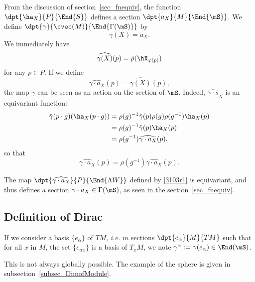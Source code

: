 From the discussion of section~\ref{sec_fnequiv}, the function $\dpt{\ha_X}{P}{\End{S}}$ defines a section $\dpt{a_X}{M}{\End{\mS}}$. We define $\dpt{\gamma}{\cvec(M)}{\End{\Gamma(\mS)}}$ by
\begin{equation}		\label{EqDefgammax}
                       \gamma(X)=a_X.
\end{equation}
We immediately have
\[
                     \widehat{\gamma(X)}(p)=\tilde\rho(\hX_{\varphi(p)})
\]
for any $p\in P$. If we define
\begin{equation}\label{3103r1}
  \widehat{\gamma\cdot a_X}(p)=\widehat{\gamma(X)}(p),
\end{equation}
the map $\gamma$ can be seen as an action on the section of $\mS$. Indeed, $\widehat{\gamma\cdot s}_X$ is an equivariant function:
\begin{equation}
\begin{split}
 \hat{\gamma}(p\cdot g)(\ha_X(p\cdot g))
                  &=\rho(g)^{-1}\hat{\gamma}(p)\rho(g)\rho(g^{-1})\ha_X(p)\\
                  &=\rho(g)^{-1}\hat{\gamma}(p)\ha_X(p)\\
                  &=\rho(g^{-1})\widehat{\gamma\cdot a_X}(p),
\end{split}
\end{equation}
 so that
\[
    \widehat{\gamma\cdot a_X}(p)=\rho(g^{-1})\widehat{\gamma\cdot a_X}(p).
\]

The map $\dpt{\widehat{\gamma\cdot a_X}}{P}{\End{\Lambda W }}$ defined by \eqref{3103r1} is equivariant, and thus defines a section
$\gamma\cdot a_X\in\Gamma(\mS)$, as seen in the section~\ref{sec_fnequiv}.

\subsection{Definition of Dirac}

If we consider a basis $\{e_{\alpha}\}$ of $TM$, \emph{i.e.} $m$ sections $\dpt{e_{\alpha}}{M}{TM}$ such that for all $x$ in $M$, the set $\{e_{\alpha x}\}$ is a basis of $T_xM$, we note $\gamma^{\alpha}:=\gamma(e_{\alpha})\in\End(\mS)$.

\begin{remark}
This is not always globally possible. The example of the sphere is given in subsection~\ref{subsec_DimofModule}.
\label{rem_secnoglobal}
\end{remark}

